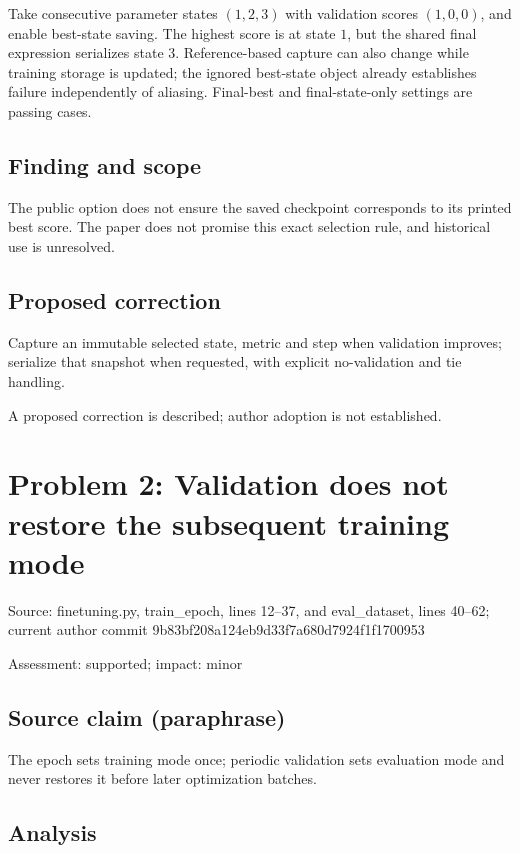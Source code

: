 \documentclass[11pt]{article}
\begin{document}
Take consecutive parameter states \((1,2,3)\) with validation scores \((1,0,0)\), and enable best-state saving. The highest score is at state \(1\), but the shared final expression serializes state \(3\). Reference-based capture can also change while training storage is updated; the ignored best-state object already establishes failure independently of aliasing. Final-best and final-state-only settings are passing cases.

\subsection*{Finding and scope}

The public option does not ensure the saved checkpoint corresponds to its printed best score. The paper does not promise this exact selection rule, and historical use is unresolved.

\subsection*{Proposed correction}

Capture an immutable selected state, metric and step when validation improves; serialize that snapshot when requested, with explicit no-validation and tie handling.

A proposed correction is described; author adoption is not established.

\section*{Problem 2: Validation does not restore the subsequent training mode}

Source: finetuning.py, train\_epoch, lines 12–37, and eval\_dataset, lines 40–62; current author commit 9b83bf208a124eb9d33f7a680d7924f1f1700953

Assessment: supported; impact: minor

\subsection*{Source claim (paraphrase)}

The epoch sets training mode once; periodic validation sets evaluation mode and never restores it before later optimization batches.

\subsection*{Analysis}
\end{document}
